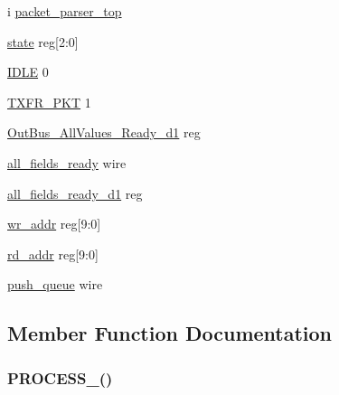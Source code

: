 \begin{DoxyCompactItemize}
\item 
i \mbox{\hyperlink{enumpacket__parser__top__tb_a7123921cf22dcde880af6f141d7f186d}{packet\+\_\+parser\+\_\+top}}
\item 
\mbox{\hyperlink{enumpacket__parser__top__tb_a0feaee318fc79d5645a7a497966d79a2}{state}} reg\mbox{[}2\+:0\mbox{]}
\item 
\mbox{\hyperlink{enumpacket__parser__top__tb_a77f10db5d1edf2cbbf2ea75626bc130e}{I\+D\+LE}} 0
\item 
\mbox{\hyperlink{enumpacket__parser__top__tb_acc8439edf27c04ea18e30cbd0b85e4d7}{T\+X\+F\+R\+\_\+\+P\+KT}} 1
\item 
\mbox{\hyperlink{enumpacket__parser__top__tb_a12e0d38624187f2a91f99b60297754c2}{Out\+Bus\+\_\+\+All\+Values\+\_\+\+Ready\+\_\+d1}} reg
\item 
\mbox{\hyperlink{enumpacket__parser__top__tb_ae4b2da01c8aacb18bea197efcdb230f0}{all\+\_\+fields\+\_\+ready}} wire
\item 
\mbox{\hyperlink{enumpacket__parser__top__tb_afcfae2318d3fa2f468b7a09bb72a0345}{all\+\_\+fields\+\_\+ready\+\_\+d1}} reg
\item 
\mbox{\hyperlink{enumpacket__parser__top__tb_af1832ebe93b9257253409a07fb3c8a48}{wr\+\_\+addr}} reg\mbox{[}9\+:0\mbox{]}
\item 
\mbox{\hyperlink{enumpacket__parser__top__tb_a31ec51cb3369def58c9a65744ddbfa9a}{rd\+\_\+addr}} reg\mbox{[}9\+:0\mbox{]}
\item 
\mbox{\hyperlink{enumpacket__parser__top__tb_ad3a4f0399068428438a4d1280e7547d4}{push\+\_\+queue}} wire
\end{DoxyCompactItemize}


\subsection{Member Function Documentation}
\mbox{\label{enumpacket__parser__top__tb_a17a60d01357f6cd3aa4f63a218b9eb5d}} 
\subsubsection{\texorpdfstring{P\+R\+O\+C\+E\+S\+S\+\_()}{PROCESS\_3()}}
{\footnotesize\ttfamily \hspace{0.3cm}}



